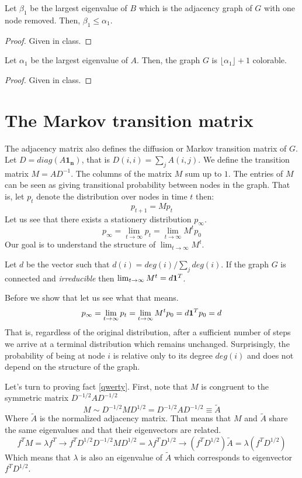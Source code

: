 \documentclass{article}
\begin{document}
\begin{fact}
Let $\beta_1$ be the largest eigenvalue of $B$ which is the adjacency graph of $G$ with one node removed. 
Then, $\beta_1 \le \alpha_1$. 
\end{fact}
\begin{proof}
Given in class.
\end{proof}


\begin{fact}
Let $\alpha_1$ be the largest eigenvalue of $A$. Then, the graph $G$ is $\lfloor \alpha_1 \rfloor +1$ colorable.
\end{fact}
\begin{proof}
Given in class.
\end{proof}


\section{The Markov transition matrix}
 
The adjacency matrix also defines the diffusion or Markov transition matrix of $G$.
Let $D = diag(A \mathbf{1_n})$, that is $D(i,i) = \sum_{j}A(i,j)$.
We define the transition matrix $M = AD^{-1}$. The columns of the matrix $M$ sum up to $1$.
The entries of $M$ can be seen as giving transitional probability between nodes in the graph.
That is, let $p_t$ denote the distribution over nodes in time $t$ then:
\[
p_{t+1} = Mp_{t}
\]
Let us see that there exists a stationery distribution $p_\infty$.
\[
p_\infty = \lim_{t \rightarrow \infty} p_t =  \lim_{t \rightarrow \infty} M^{t}  p_{0}
\]
Our goal is to understand the structure of $\lim_{t \rightarrow \infty} M^{t}$.
\begin{fact}\label{qwerty}
Let $d$ be the vector such that $d(i) = deg(i)/\sum_{j}deg(i)$. If the graph $G$ is 
connected and {\it irreducible} then $\lim_{t \rightarrow \infty} M^{t} = d\mathbf{1}^T$.
\end{fact}
Before we show that let us see what that means.
\[
p_\infty = \lim_{t \rightarrow \infty} p_t =  \lim_{t \rightarrow \infty} M^{t}  p_{0}  = d\mathbf{1}^T p_0 = d
\]
That is, regardless of the original distribution, after a sufficient number of steps we arrive at 
a terminal distribution which remains unchanged. Surprisingly, the probability of being at node $i$ is
relative only to its degree $deg(i)$ and does not depend on the structure of the graph.

Let's turn to proving fact \ref{qwerty}. First, note that $M$ is congruent to the symmetric matrix  $D^{-1/2}AD^{-1/2}$
\[
M \sim D^{-1/2}MD^{1/2} = D^{-1/2}AD^{-1/2} \equiv \tilde{A}
\]
Where $\tilde{A}$ is the normalized adjacency matrix. 
That means that $M$ and $\tilde{A}$ share the same eigenvalues and that their eigenvectors are related.
\[
f^{T}M = \lambda f^{T} \rightarrow f^{T}D^{1/2}D^{-1/2}MD^{1/2} = \lambda f^{T}D^{1/2} \rightarrow (f^{T}D^{1/2})\tilde{A} = \lambda (f^{T}D^{1/2})
\]
Which means that $\lambda$ is also an eigenvalue of $\tilde{A}$ which corresponds to eigenvector $f^{T}D^{1/2}$.
\end{document}
